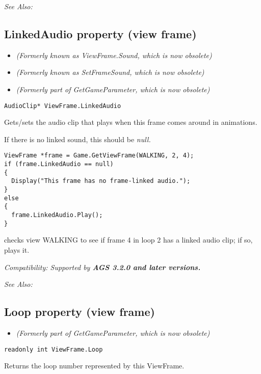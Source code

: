 \it{See Also:} 


\subsection{LinkedAudio property (view frame)}\label{ViewFrame.LinkedAudio}%

\begin{itemize}
\item \it{(Formerly known as ViewFrame.Sound, which is now obsolete)}
\item \it{(Formerly known as SetFrameSound, which is now obsolete)}
\item \it{(Formerly part of GetGameParameter, which is now obsolete)}
\end{itemize}

\begin{verbatim}
AudioClip* ViewFrame.LinkedAudio
\end{verbatim}
Gets/sets the audio clip that plays when this frame comes around in animations.

If there is no linked sound, this should be \it{null}.

\begin{verbatim}
ViewFrame *frame = Game.GetViewFrame(WALKING, 2, 4);
if (frame.LinkedAudio == null)
{
  Display("This frame has no frame-linked audio.");
}
else
{
  frame.LinkedAudio.Play();
}
\end{verbatim}
checks view WALKING to see if frame 4 in loop 2 has a linked audio clip; if so, plays it.

\it{Compatibility:} Supported by \bf{AGS 3.2.0} and later versions.

\it{See Also:} 


\subsection{Loop property (view frame)}\label{ViewFrame.Loop}%

\begin{itemize}
\item \it{(Formerly part of GetGameParameter, which is now obsolete)}
\end{itemize}

\begin{verbatim}
readonly int ViewFrame.Loop
\end{verbatim}
Returns the loop number represented by this ViewFrame.

